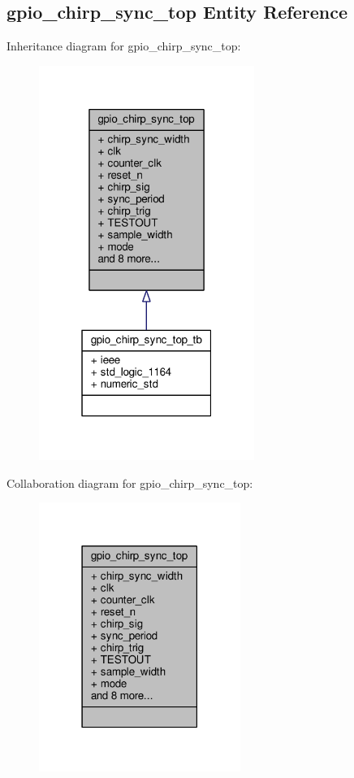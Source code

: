 \subsection{gpio\+\_\+chirp\+\_\+sync\+\_\+top Entity Reference}
\label{classgpio__chirp__sync__top}


Inheritance diagram for gpio\+\_\+chirp\+\_\+sync\+\_\+top\+:\nopagebreak
\begin{figure}[H]
\begin{center}
\leavevmode
\includegraphics[width=199pt]{d1/db4/classgpio__chirp__sync__top__inherit__graph}
\end{center}
\end{figure}


Collaboration diagram for gpio\+\_\+chirp\+\_\+sync\+\_\+top\+:\nopagebreak
\begin{figure}[H]
\begin{center}
\leavevmode
\includegraphics[width=186pt]{d9/de5/classgpio__chirp__sync__top__coll__graph}
\end{center}
\end{figure}
